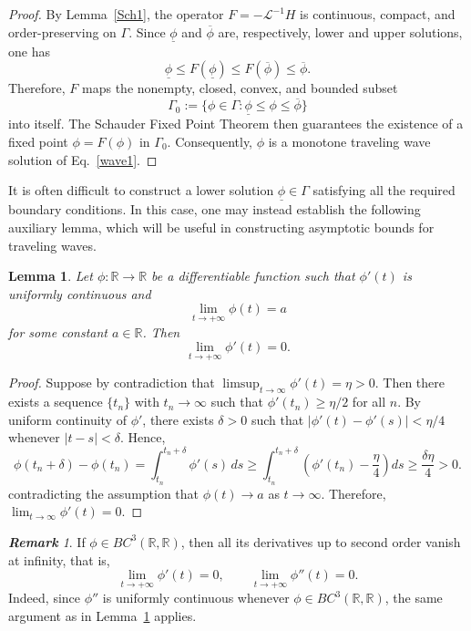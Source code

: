 \documentclass[12pt,letterpaper]{amsart}
\newtheorem{lemma}[theorem]{Lemma}
\theoremstyle{definition}
\theoremstyle{remark}
\newtheorem{remark}[theorem]{{\bf Remark}}
\numberwithin{equation}{section}
\begin{document}
 \begin{proof}
 	By Lemma~\ref{Sch1}, the operator $F=-\mathcal L^{-1}H$ is continuous, compact, and order-preserving on $\Gamma$. 
 	Since $\underline{\phi}$ and $\overline{\phi}$ are, respectively, lower and upper solutions, one has
 	\[
 	\underline{\phi} \le F(\underline{\phi}) \le F(\overline{\phi}) \le \overline{\phi}.
 	\]
 	Therefore, $F$ maps the nonempty, closed, convex, and bounded subset 
 	\[
 	\Gamma_0 := \{\phi\in\Gamma : \underline{\phi}\le \phi \le \overline{\phi}\}
 	\]
 	into itself. The Schauder Fixed Point Theorem then guarantees the existence of a fixed point $\phi=F(\phi)$ in $\Gamma_0$. 
 	Consequently, $\phi$ is a monotone traveling wave solution of Eq.~\eqref{wave1}.
 \end{proof}
 
 \medskip
 
 It is often difficult to construct a lower solution $\underline{\phi}\in\Gamma$ satisfying all the required boundary conditions. 
 In this case, one may instead establish the following auxiliary lemma, which will be useful in constructing asymptotic bounds for traveling waves.
 
 \begin{lemma}\label{diff1}
 	Let $\phi:\mathbb R\to\mathbb R$ be a differentiable function such that $\phi'(t)$ is uniformly continuous and 
 	\[
 	\lim_{t\to+\infty}\phi(t)=a
 	\]
 	for some constant $a\in\mathbb R$. Then 
 	\[
 	\lim_{t\to+\infty}\phi'(t)=0.
 	\]
 \end{lemma}
 
 \begin{proof}
 	Suppose by contradiction that $\limsup_{t\to\infty}\phi'(t)=\eta>0$. 
 	Then there exists a sequence $\{t_n\}$ with $t_n\to\infty$ such that $\phi'(t_n)\ge\eta/2$ for all $n$. 
 	By uniform continuity of $\phi'$, there exists $\delta>0$ such that 
 	\(
 	|\phi'(t)-\phi'(s)|<\eta/4
 	\)
 	whenever $|t-s|<\delta$. 
 	Hence,
 	$$
 	\phi(t_n + \delta) - \phi(t_n) 
 	= \int_{t_n}^{t_n + \delta} \phi'(s)\, ds 
 	\ge \int_{t_n}^{t_n + \delta} \left( \phi'(t_n) - \frac{\eta}{4} \right) ds 
 	\ge \frac{\delta \eta}{4} > 0.
 	$$
 	contradicting the assumption that $\phi(t)\to a$ as $t\to\infty$. 
 	Therefore, $\lim_{t\to\infty}\phi'(t)=0$.
 \end{proof}
 
 \begin{remark}
 	If $\phi\in BC^3(\mathbb R,\mathbb R)$, then all its derivatives up to second order vanish at infinity, that is,
 	\[
 	\lim_{t\to+\infty}\phi'(t)=0, 
 	\qquad 
 	\lim_{t\to+\infty}\phi''(t)=0.
 	\]
 	Indeed, since $\phi''$ is uniformly continuous whenever $\phi\in BC^3(\mathbb R,\mathbb R)$, the same argument as in Lemma~\ref{diff1} applies.
 \end{remark}
 
\end{document}
